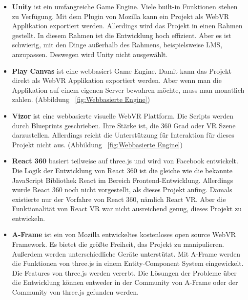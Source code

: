  \begin{itemize}
 
     \item \textbf{Unity} \citep{37} ist ein umfangreiche Game Engine. Viele built-in Funktionen stehen zu Verfügung. Mit dem Plugin von Mozilla kann ein Projekt als WebVR Applikation exportiert werden. Allerdings wird das Projekt in einen Rahmen gestellt. In diesem Rahmen ist die Entwicklung hoch effizient. Aber es ist schwierig, mit den Dinge außerhalb des Rahmens, beispielsweise LMS, anzupassen. Deswegen wird Unity nicht ausgewählt.
     
     \item \textbf{Play Canvas} \citep{38} ist eine webbasiert Game Engine. Damit kann das Projekt direkt als WebVR Applikation exportiert werden. Aber wenn man die Applikation auf einem eigenen Server bewahren möchte, muss man monatlich zahlen. (Abbildung ~\ref{fig:Webbasierte Engine})
     
     \item \textbf{Vizor} \citep{39} ist eine webbasierte visuelle WebVR Plattform. Die Scripts werden durch Blueprints geschrieben. Ihre Stärke ist, die 360 Grad oder VR Szene darzustellen. Allerdings reicht die Unterstützung für Interaktion für dieses Projekt nicht aus. (Abbildung ~\ref{fig:Webbasierte Engine})
     
     \item \textbf{React 360} \citep{40} basiert teilweise auf three.js und wird von Facebook entwickelt. Die Logik der Entwicklung von React 360 ist die gleiche wie die bekannte JavaScript Bibliothek React im Bereich Frontend-Entwicklung. Allerdings wurde React 360 noch nicht vorgestellt, als dieses Projekt anfing. Damals existierte nur der Vorfahre von React 360, nämlich React VR. Aber die Funktionalität von React VR war nicht ausreichend genug, dieses Projekt zu entwickeln.
     
     \item \textbf{A-Frame} \citep{41} ist ein von Mozilla entwickeltes kostenloses open source WebVR Framework. Es bietet die größte Freiheit, das Projekt zu manipulieren. Außerdem werden unterschiedliche Geräte unterstützt. Mit A-Frame werden die Funktionen von three.js in einem Entity-Component System eingewickelt. Die Features von three.js werden vererbt. Die Lösungen der Probleme über die Entwicklung können entweder in der Community von A-Frame oder der Community von three.js gefunden werden.
     
 \end{itemize}
 
